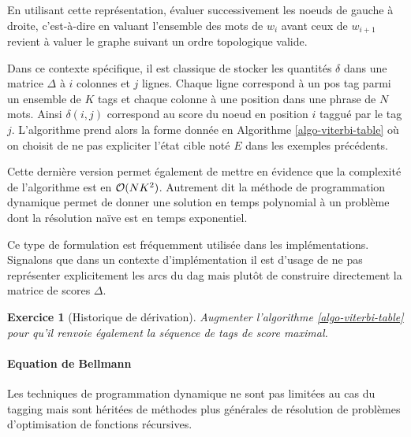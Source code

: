 \documentclass[11pt,openany]{book}
\newtheorem{exo}{Exercice}[chapter]
\newcommand{\ac}[1]{{\sc #1}} %
\begin{document}
En utilisant cette représentation, évaluer successivement les noeuds
de gauche à droite,  c'est-à-dire en valuant l'ensemble des mots de
$w_i$  avant ceux de $w_{i+1}$ revient à valuer le graphe suivant un
ordre topologique valide.

Dans ce contexte spécifique, il est classique de stocker les quantités
$\delta$ dans une matrice $\Delta$ à $i$ colonnes et $j$ lignes.
Chaque ligne correspond à un pos tag parmi un ensemble de $K$ tags et chaque colonne à une position
dans une phrase de $N$ mots. Ainsi $\delta(i,j)$ correspond au score du noeud en
position $i$ taggué par le tag $j$. L'algorithme prend alors la forme
donnée en Algorithme \ref{algo-viterbi-table} où on choisit de 
ne pas expliciter l'état cible noté $E$ dans les exemples précédents.

Cette dernière version permet également de mettre en évidence que la complexité
de l'algorithme est en ${\cal O}(NK^2)$.  
Autrement dit la méthode de programmation dynamique permet de
donner une solution en temps polynomial à un problème dont la
résolution naïve est en temps exponentiel.

\begin{algorithm}[htbp]
\caption{\label{algo-viterbi-table}Algorithme de Viterbi (version tabulaire)}
\end{algorithm}

Ce type de formulation est fréquemment utilisée dans les
implémentations. Signalons que dans un contexte d'implémentation il est d'usage de
ne pas représenter explicitement les arcs du \ac{dag} mais plutôt de
construire directement la matrice de scores $\Delta$.

\begin{exo}[Historique de dérivation]
Augmenter l'algorithme \ref{algo-viterbi-table} pour qu'il renvoie
également la séquence de tags de score maximal.
\end{exo}

\paragraph{Equation de Bellmann}
Les techniques de programmation dynamique ne sont pas limitées
au cas du tagging mais sont héritées de méthodes plus générales de
résolution de problèmes d'optimisation de fonctions récursives.
\end{document}
